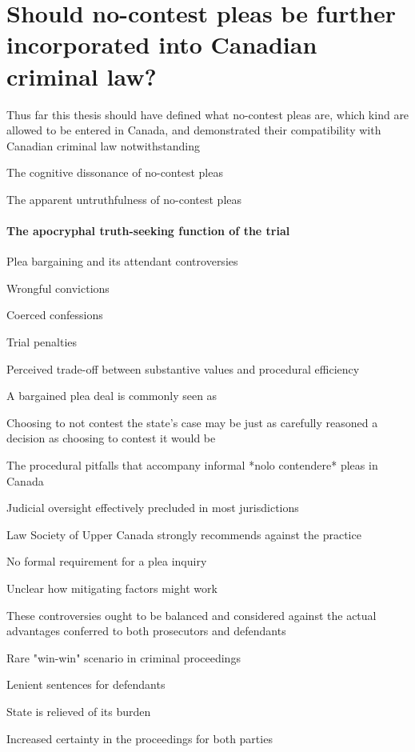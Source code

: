 \chapter{Should no-contest pleas be further incorporated into Canadian criminal law?}

Thus far this thesis should have defined what no-contest pleas are, which kind are allowed to be entered in Canada, and demonstrated their compatibility with Canadian criminal law notwithstanding

The cognitive dissonance of no-contest pleas

The apparent untruthfulness of no-contest pleas



\subsubsection{The apocryphal truth-seeking function of the trial}

Plea bargaining and its attendant controversies

Wrongful convictions

Coerced confessions

Trial penalties

Perceived trade-off between substantive values and procedural efficiency

A bargained plea deal is commonly seen as

Choosing to not contest the state's case may be just as carefully reasoned a decision as choosing to contest it would be

The procedural pitfalls that accompany informal *nolo contendere* pleas in Canada

Judicial oversight effectively precluded in most jurisdictions

Law Society of Upper Canada strongly recommends against the practice

No formal requirement for a plea inquiry

Unclear how mitigating factors might work

These controversies ought to be balanced and considered against the actual advantages conferred to both prosecutors and defendants

Rare "win-win" scenario in criminal proceedings

Lenient sentences for defendants

State is relieved of its burden

Increased certainty in the proceedings for both parties

